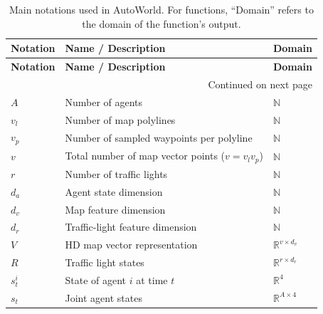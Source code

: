\documentclass[runningheads]{llncs}
\begin{document}
{\scriptsize
\begin{longtable}{lll}
\caption{Main notations used in AutoWorld. For functions, ``Domain'' refers to the domain of the function's output.}
\label{tab:notations} \\

\toprule
\textbf{Notation} & \textbf{Name / Description} & \textbf{Domain} \\
\midrule
\endfirsthead

\toprule
\textbf{Notation} & \textbf{Name / Description} & \textbf{Domain} \\
\midrule
\endhead

\midrule
\multicolumn{3}{r}{Continued on next page}
\endfoot

\bottomrule
\endlastfoot


\multicolumn{3}{l}{\texttt{Scene encoder}} \\

$A$ & Number of agents & $\mathbb N$ \\

$v_l$ & Number of map polylines & $\mathbb N$ \\

$v_p$ & Number of sampled waypoints per polyline & $\mathbb N$ \\

$v$ & Total number of map vector points ($v=v_l v_p$) & $\mathbb N$ \\

$r$ & Number of traffic lights & $\mathbb N$ \\

$d_a$ & Agent state dimension & $\mathbb N$ \\

$d_v$ & Map feature dimension & $\mathbb N$ \\

$d_r$ & Traffic-light feature dimension & $\mathbb N$ \\

$V$ & HD map vector representation & $\mathbb{R}^{v \times d_v}$ \\

$R$ & Traffic light states & $\mathbb{R}^{r \times d_r}$ \\

$s_t^i$ & State of agent $i$ at time $t$ & $\mathbb{R}^{4}$ \\

$s_t$ & Joint agent states & $\mathbb{R}^{A \times 4}$ \\


\end{longtable}}
\end{document}
